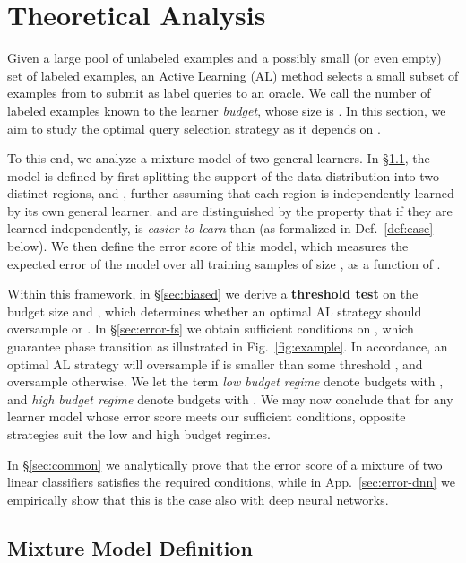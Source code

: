 \documentclass{article}
\newcommand{\app}{App.}
\begin{document}
\section{Theoretical Analysis}\label{sec:theoretical_analysis}

Given a large pool of  unlabeled examples and a possibly small (or even empty) set of  labeled examples, an Active Learning (AL) method selects a small subset of  examples from  to submit as label queries to an oracle. We call the number of labeled examples known to the learner \emph{budget}, whose size is . In this section, we aim to study the optimal query selection strategy as it depends on .

To this end, we analyze a mixture model of two general learners. In \S\ref{sec:model}, the model is defined by first splitting the support of the data distribution into two distinct regions,  and , further assuming that each region is independently learned by its own general learner.  and  are distinguished by the property that if they are learned independently,  is \emph{easier to learn} than  (as formalized in Def.~\ref{def:ease} below). We then define the error score  of this model, which measures the expected error of the model over all training samples of size , as a function of . 

Within this framework, in \S\ref{sec:biased} we derive a \textbf{threshold test} on the budget size  and , which determines whether an optimal AL strategy should oversample   or . In \S\ref{sec:error-fs} we obtain sufficient conditions on , which guarantee phase transition as illustrated in Fig.~\ref{fig:example}. In accordance, an optimal AL strategy will oversample  if  is smaller than some threshold , and oversample  otherwise. We let the term \emph{low budget regime} denote budgets with , and \emph{high budget regime} denote budgets with . We may now conclude that for any learner model whose error score meets our sufficient conditions, opposite strategies suit the low and high budget regimes. 

In \S\ref{sec:common} we analytically prove that the error score of a mixture of two linear classifiers satisfies the required conditions, while in \app~\ref{sec:error-dnn} we empirically show that this is the case also with deep neural networks. 


\subsection{Mixture Model Definition}
\label{sec:model}
\end{document}
